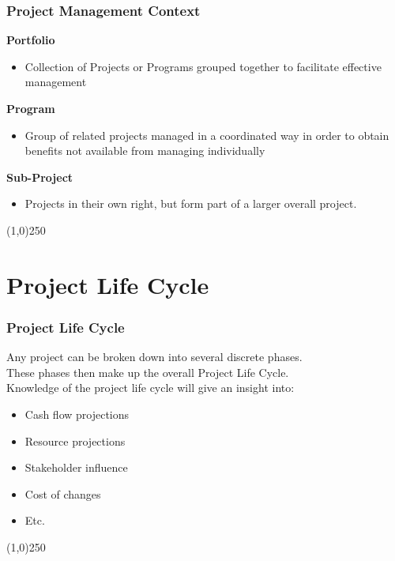 \begin{frame}
\frametitle{Project Management Context}
\textbf{Portfolio}
\begin{itemize}
	\item Collection of Projects or Programs grouped together to facilitate effective management
\end{itemize}
\textbf{Program}
\begin{itemize}
	\item Group of related projects managed in a coordinated way in order to obtain benefits not available from managing individually
\end{itemize}
\textbf{Sub-Project}
\begin{itemize}
	\item Projects in their own right, but form part of a larger overall project.
\end{itemize}
\end{frame}
\begin{center}\line(1,0){250}\end{center}


\section{Project Life Cycle}


\begin{frame}
\frametitle{Project Life Cycle}
Any project can be broken down into several discrete phases.\\
These phases then make up the overall Project Life Cycle.\\
Knowledge of the project life cycle will give an insight into:\\
\begin{itemize}
	\item Cash flow projections
	\item Resource projections
	\item Stakeholder influence
	\item Cost of changes
	\item Etc.
\end{itemize}
\end{frame}
\begin{center}\line(1,0){250}\end{center}



